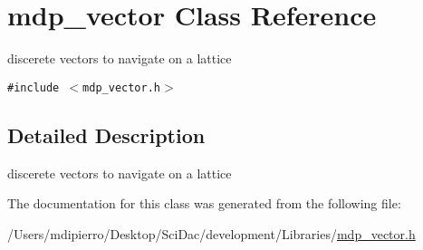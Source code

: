 \hypertarget{classmdp__vector}{
\section{mdp\_\-vector Class Reference}
\label{classmdp__vector}
}
discerete vectors to navigate on a lattice  


{\tt \#include $<$mdp\_\-vector.h$>$}



\subsection{Detailed Description}
discerete vectors to navigate on a lattice 

The documentation for this class was generated from the following file:\begin{CompactItemize}
\item 
/Users/mdipierro/Desktop/SciDac/development/Libraries/\hyperlink{mdp__vector_8h}{mdp\_\-vector.h}\end{CompactItemize}

